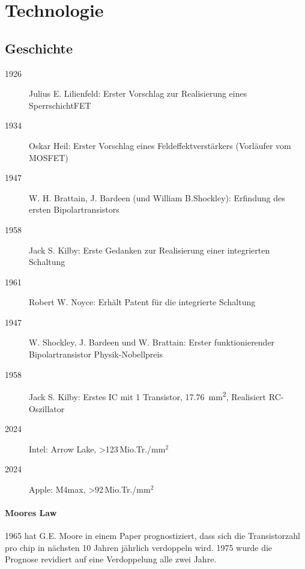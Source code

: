 
\section{Technologie}

\subsection{Geschichte} %
\begin{description}
    \item[1926] Julius E. Lilienfeld: Erster Vorschlag zur Realisierung eines SperrschichtFET
    
    \item[1934] Oskar Heil: Erster Vorschlag eines Feldeffektverstärkers (Vorläufer vom MOSFET)
    \item[1947] W. H. Brattain, J. Bardeen (und William B.Shockley): Erfindung des ersten Bipolartransistors
    \item[1958] Jack S. Kilby: Erste Gedanken zur Realisierung einer integrierten Schaltung
    \item[1961] Robert W. Noyce: Erhält Patent für die integrierte Schaltung
    \item[1947] W. Shockley, J. Bardeen und W. Brattain: Erster funktionierender Bipolartransistor \rightarrow Physik-Nobellpreis
    \item[1958] Jack S. Kilby: Erstes IC mit 1 Transistor, \qty{17.76}{\square\milli\meter}, Realisiert RC-Oszillator
    \item[2024] Intel: Arrow Lake, >123\,Mio.Tr./mm$^2$
    \item[2024] Apple: M4max, >92\,Mio.Tr./mm$^2$
\end{description}

\paragraph{Moores Law}
1965 hat G.E. Moore in einem Paper prognostiziert, dass sich die Transistorzahl pro chip in nächsten 10 Jahren jährlich verdoppeln wird. 
1975 wurde die Prognose revidiert auf eine Verdoppelung alle zwei Jahre.

